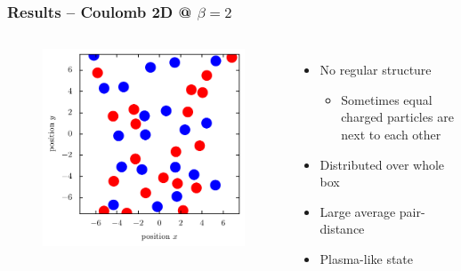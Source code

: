 \documentclass[mathserif,serif]{beamer}
\begin{document}
\begin{frame}
	\frametitle{Results -- Coulomb 2D @ $\beta=2$}
	\centering
	\begin{columns}	
	\begin{figure}
	\includegraphics[width=\textwidth]{../report/figures/Plasma_1_beta_2.pdf}
	\end{figure}
	\begin{itemize}
	\item No regular structure
	\begin{itemize}
		\item Sometimes equal charged particles are next to each other
	\end{itemize}
	\item Distributed over whole box
	\item Large average pair-distance
	\item Plasma-like state
	\end{itemize}
\end{columns}
\end{frame}
\end{document}
